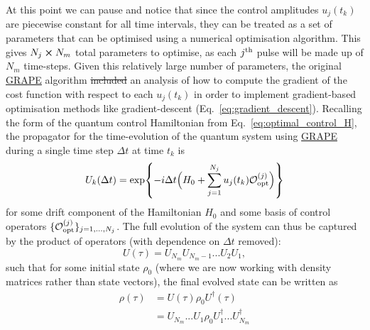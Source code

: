 \documentclass[a4paper,oneside,11pt]{book}
\newcommand{\adj}[1]{#1^{\dagger}}
\newcommand{\acrref}[1]{\hyperref[acr:#1]{#1}}
\providecommand{\DIFaddtex}[1]{{\protect\color{blue}\uwave{#1}}} %
\providecommand{\DIFdeltex}[1]{{\protect\color{red}\sout{#1}}}                      %
\providecommand{\DIFaddbegin}{} %
\providecommand{\DIFaddend}{} %
\providecommand{\DIFdelbegin}{} %
\providecommand{\DIFdelend}{} %
\providecommand{\DIFadd}[1]{\texorpdfstring{\DIFaddtex{#1}}{#1}} %
\providecommand{\DIFdel}[1]{\texorpdfstring{\DIFdeltex{#1}}{}} %
\newcommand{\DIFscaledelfig}{0.5}
\newlength{\DIFdelgraphicswidth} %
\newlength{\DIFdelgraphicsheight} %
\newcommand{\DIFaddincludegraphics}[2][]{{\color{blue}\fbox{\DIFOincludegraphics[#1]{#2}}}} %
\newcommand{\DIFdelincludegraphics}[2][]{%
\sbox{\DIFdelgraphicsbox}{\DIFOincludegraphics[#1]{#2}}%
\settoboxwidth{\DIFdelgraphicswidth}{\DIFdelgraphicsbox} %
\settoboxtotalheight{\DIFdelgraphicsheight}{\DIFdelgraphicsbox} %
\scalebox{\DIFscaledelfig}{%
\parbox[b]{\DIFdelgraphicswidth}{\usebox{\DIFdelgraphicsbox}\\[-\baselineskip] \rule{\DIFdelgraphicswidth}{0em}}\llap{\resizebox{\DIFdelgraphicswidth}{\DIFdelgraphicsheight}{%
\setlength{\unitlength}{\DIFdelgraphicswidth}%
\begin{picture}(1,1)%
\thicklines\linethickness{2pt} %
{\color[rgb]{1,0,0}\put(0,0){\framebox(1,1){}}}%
{\color[rgb]{1,0,0}\put(0,0){\line( 1,1){1}}}%
{\color[rgb]{1,0,0}\put(0,1){\line(1,-1){1}}}%
\end{picture}%
}\hspace*{3pt}}} %
} %
\DeclareRobustCommand{\DIFaddbegin}{\DIFOaddbegin \let\includegraphics\DIFaddincludegraphics} %
\DeclareRobustCommand{\DIFaddend}{\DIFOaddend \let\includegraphics\DIFOincludegraphics} %
\DeclareRobustCommand{\DIFdelbegin}{\DIFOdelbegin \let\includegraphics\DIFdelincludegraphics} %
\DeclareRobustCommand{\DIFdelend}{\DIFOaddend \let\includegraphics\DIFOincludegraphics} %
\begin{document}
At this point we can pause and notice that since the control amplitudes $u_j(t_k)$ are piecewise constant for all time intervals, they can be treated as a set of parameters that can be optimised using a numerical optimisation algorithm. This gives $N_j \cross N_m$ total parameters to optimise, as each $j^{\rm th}$ pulse will be made up of $N_m$ time-steps. Given this relatively large number of parameters, the original \acrref{GRAPE} algorithm \DIFdelbegin \DIFdel{included }\DIFdelend \DIFaddbegin \DIFadd{includes }\DIFaddend an analysis of how to compute the gradient of the cost function with respect to each $u_j(t_k)$ in order to implement gradient-based optimisation methods like gradient-descent (Eq.~\eqref{eq:gradient_descent}). Recalling the form of the quantum control Hamiltonian from Eq.~\eqref{eq:optimal_control_H}, the propagator for the time-evolution of the quantum system using \acrref{GRAPE} during a single time step $\Delta t$ at time $t_k$ is
\begin{equation}
    U_k(\Delta t) = \exp{- i \Delta t \Big( H_0 + \sum_{j=1}^{N_j} u_j(t_k) \mathcal{O}_{\rm opt}^{(j)} \Big)}
\end{equation}
for some drift component of the Hamiltonian $H_0$ and some basis of control operators $\{\mathcal{O}_{\rm opt}^{(j)}\}_{j = 1,...,N_j}$. The full evolution of the system can thus be captured by the product of operators (with dependence on $\Delta t$ removed):
\begin{equation}
    U(\tau) = U_{N_m} U_{N_m - 1} ... U_{2} U_{1},
\end{equation}
such that for some initial state $\rho_0$ (where we are now working with density matrices rather than state vectors), the final evolved state can be written as
\begin{equation}\label{eq:grape_rho_evolved}
    \begin{aligned}
        \rho(\tau) &= U(\tau)\rho_0 \adj{U}(\tau) \\
        &= U_{N_m} ... U_{1} \rho_0 \adj{U}_{1} ... \adj{U}_{N_m}
    \end{aligned}
\end{equation}
\end{document}
